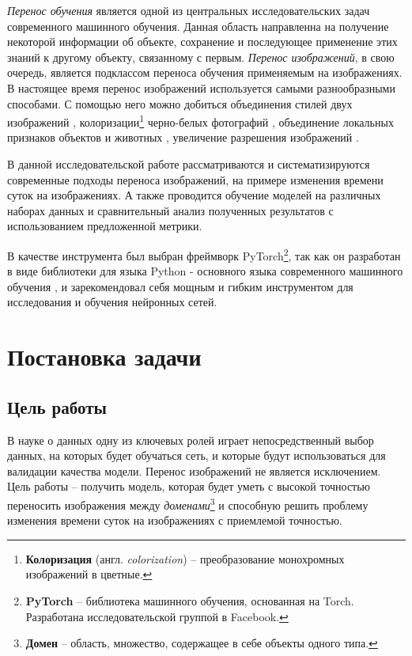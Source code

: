 \documentclass[11pt,a4paper]{extarticle}
\begin{document}
	\textit{Перенос обучения} является одной из центральных исследовательских задач современного машинного обучения.
	Данная область направленна на получение некоторой информации об объекте, сохранение и последующее применение этих знаний к другому объекту, связанному с первым.   
	\textit{Перенос изображений}, в свою очередь, является подклассом переноса обучения применяемым на изображениях. 
	В настоящее время перенос изображений используется самыми разнообразными способами.
	С помощью него можно добиться объединения стилей двух изображений \cite{style_transfer},
	колоризации\footnote{
		\textbf{Колоризация} (англ. \textit{colorization}) -- преобразование монохромных изображений в цветные.
	} черно-белых фотографий \cite{color_transfer}, объединение локальных признаков объектов и животных \cite{CycleGAN},
	увеличение разрешения изображений \cite{super_resolution}.

	В данной исследовательской работе рассматриваются и систематизируются современные подходы переноса изображений, на примере изменения времени суток на изображениях.
	А также проводится обучение моделей на различных наборах данных и сравнительный анализ полученных результатов с использованием предложенной метрики.
	
	В качестве инструмента был выбран фреймворк PyTorch\footnote{
		\textbf{PyTorch} -- библиотека машинного обучения, основанная на Torch. Разработана исследовательской группой в Facebook.
	}, так как он разработан в виде библиотеки для языка Python - основного языка современного машинного обучения \cite{ml_lang},
	и зарекомендовал себя мощным и гибким инструментом для исследования и обучения нейронных сетей.

\newpage
\section{Постановка задачи}
	\subsection{Цель работы}
		В науке о данных одну из ключевых ролей играет непосредственный выбор данных, на которых будет обучаться сеть, 
		и которые будут использоваться для валидации качества модели. Перенос изображений не является исключением.
		Цель работы -- получить модель, которая будет уметь с высокой точностью переносить изображения между \textit{доменами}\footnote{
			\textbf{Домен} -- область, множество, содержащее в себе объекты одного типа. 
		} и способную решить проблему изменения времени суток на изображениях с приемлемой точностью.
	
\end{document}
